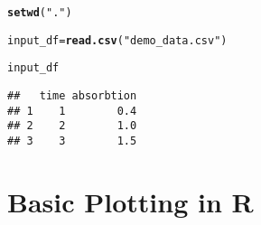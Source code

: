 \documentclass[a4paper,10pt]{book}\usepackage[]{graphicx}\usepackage[]{color}
\makeatletter
\newcommand{\hlstr}[1]{\textcolor[rgb]{0.192,0.494,0.8}{#1}}%
\newcommand{\hlstd}[1]{\textcolor[rgb]{0.345,0.345,0.345}{#1}}%
\newcommand{\hlkwb}[1]{\textcolor[rgb]{0.69,0.353,0.396}{#1}}%
\newcommand{\hlkwd}[1]{\textcolor[rgb]{0.737,0.353,0.396}{\textbf{#1}}}%
\newenvironment{kframe}{%
 \def\at@end@of@kframe{}%
 \ifinner\ifhmode%
  \def\at@end@of@kframe{\end{minipage}}%
  \begin{minipage}{\columnwidth}%
 \fi\fi%
 \def\FrameCommand##1{\hskip\@totalleftmargin \hskip-\fboxsep
 \colorbox{shadecolor}{##1}\hskip-\fboxsep
     \hskip-\linewidth \hskip-\@totalleftmargin \hskip\columnwidth}%
 \MakeFramed {\advance\hsize-\width
   \@totalleftmargin\z@ \linewidth\hsize
   \@setminipage}}%
 {\par\unskip\endMakeFramed%
 \at@end@of@kframe}
\newenvironment{knitrout}{}{} %
\makeatother
\begin{document}
\begin{knitrout}
\color{fgcolor}\begin{kframe}
\begin{alltt}
\hlkwd{setwd}\hlstd{(}\hlstr{"."}\hlstd{)}

\hlstd{input_df} \hlkwb{=} \hlkwd{read.csv}\hlstd{(}\hlstr{"demo_data.csv"}\hlstd{)}

\hlstd{input_df}
\end{alltt}
\begin{verbatim}
##   time absorbtion
## 1    1        0.4
## 2    2        1.0
## 3    3        1.5
\end{verbatim}
\end{kframe}
\end{knitrout}

\section*{Basic Plotting in R}
\end{document}
